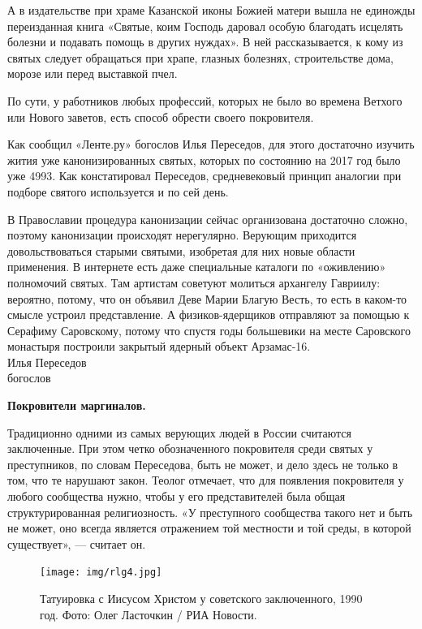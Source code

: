 А в издательстве при храме Казанской иконы Божией матери вышла не единожды переизданная книга «Святые, коим Господь даровал особую благодать исцелять болезни и подавать помощь в других нуждах». В ней рассказывается, к кому из святых следует обращаться при храпе, глазных болезнях, строительстве дома, морозе или перед выставкой пчел.

По сути, у работников любых профессий, которых не было во времена Ветхого или Нового заветов, есть способ обрести своего покровителя.

Как сообщил «Ленте.ру» богослов Илья Переседов, для этого достаточно изучить жития уже канонизированных святых, которых по состоянию на 2017 год было уже 4993. Как констатировал Переседов, средневековый принцип аналогии при подборе святого используется и по сей день.

\begin{fancyquotes}

    В Православии процедура канонизации сейчас организована достаточно сложно, поэтому канонизации происходят нерегулярно. Верующим приходится довольствоваться старыми святыми, изобретая для них новые области применения. В интернете есть даже специальные каталоги по «оживлению» полномочий святых. Там артистам советуют молиться архангелу Гавриилу: вероятно, потому, что он объявил Деве Марии Благую Весть, то есть в каком-то смысле устроил представление. А физиков-ядерщиков отправляют за помощью к Серафиму Саровскому, потому что спустя годы большевики на месте Саровского монастыря построили закрытый ядерный объект Арзамас-16.\\

    Илья Переседов\\
    богослов
\end{fancyquotes}

\textbf{Покровители маргиналов.}

Традиционно одними из самых верующих людей в России считаются заключенные. При этом четко обозначенного покровителя среди святых у преступников, по словам Переседова, быть не может, и дело здесь не только в том, что те нарушают закон. Теолог отмечает, что для появления покровителя у любого сообщества нужно, чтобы у его представителей была общая структурированная религиозность. «У преступного сообщества такого нет и быть не может, оно всегда является отражением той местности и той среды, в которой существует», — считает он.

\begin{figure}
    \centering
    \texttt{[image: img/rlg4.jpg]}
    \caption{Татуировка с Иисусом Христом у советского заключенного, 1990 год. Фото: Олег Ласточкин / РИА Новости.}
\end{figure}

